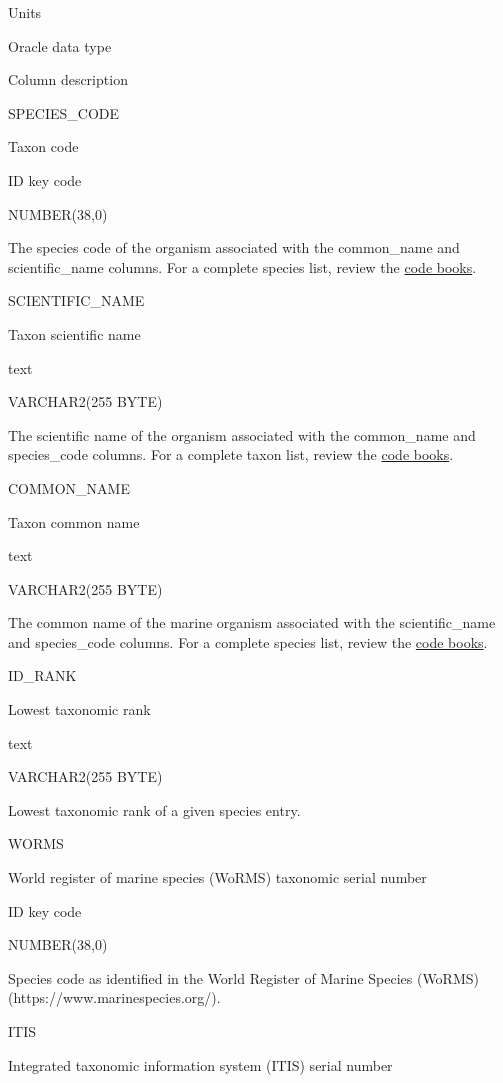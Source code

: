 \documentclass[
  letterpaper,
  oneside,
  open=any]{scrbook}
\begin{document}
Units

Oracle data type

Column description

SPECIES\_CODE

Taxon code

ID key code

NUMBER(38,0)

The species code of the organism associated with the common\_name and
scientific\_name columns. For a complete species list, review the
\href{https://www.fisheries.noaa.gov/resource/document/groundfish-survey-species-code-manual-and-data-codes-manual}{code
books}.

SCIENTIFIC\_NAME

Taxon scientific name

text

VARCHAR2(255 BYTE)

The scientific name of the organism associated with the common\_name and
species\_code columns. For a complete taxon list, review the
\href{https://www.fisheries.noaa.gov/resource/document/groundfish-survey-species-code-manual-and-data-codes-manual}{code
books}.

COMMON\_NAME

Taxon common name

text

VARCHAR2(255 BYTE)

The common name of the marine organism associated with the
scientific\_name and species\_code columns. For a complete species list,
review the
\href{https://www.fisheries.noaa.gov/resource/document/groundfish-survey-species-code-manual-and-data-codes-manual}{code
books}.

ID\_RANK

Lowest taxonomic rank

text

VARCHAR2(255 BYTE)

Lowest taxonomic rank of a given species entry.

WORMS

World register of marine species (WoRMS) taxonomic serial number

ID key code

NUMBER(38,0)

Species code as identified in the World Register of Marine Species
(WoRMS) (https://www.marinespecies.org/).

ITIS

Integrated taxonomic information system (ITIS) serial number
\end{document}
